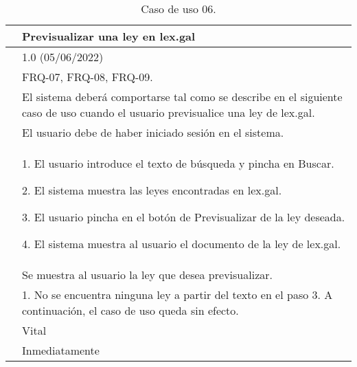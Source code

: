 \begin{table}[H]
\begin{center}
\begin{tabular}{|p{3cm}|p{10cm}|} \hline
\centering {\bf UC-06} & Previsualizar una ley en lex.gal  \\ \hline\hline
\centering {\bf Versión} & 1.0 (05/06/2022) \\ \hline
\centering {\bf Dependencias} & FRQ-07, FRQ-08, FRQ-09. \\ \hline
\centering {\bf Descripción} &  El sistema deberá comportarse tal como se describe en el siguiente caso de uso cuando el usuario previsualice una ley de lex.gal. \\ \hline
\centering {\bf Precondición} &  El usuario debe de haber iniciado sesión en el sistema. \\ \hline
\centering {\bf Secuencia normal} &  
1. El usuario introduce el texto de búsqueda y pincha en Buscar.

2. El sistema muestra las leyes encontradas en lex.gal.

3. El usuario pincha en el botón de Previsualizar de la ley deseada.

4. El sistema muestra al usuario el documento de la ley de lex.gal.
\\ \hline
\centering {\bf Postcondición} &  Se muestra al usuario la ley que desea previsualizar. \\ \hline
\centering {\bf Excepciones} & 
1. No se encuentra ninguna ley a partir del texto en el paso 3. A continuación, el caso de uso queda sin efecto.
\\ \hline
\centering {\bf Importancia} & Vital \\ \hline
\centering {\bf Urgencia} & Inmediatamente \\ \hline
\end{tabular}
\caption{Caso de uso 06.}
\label{enlaceUC6}
\end{center}
\end{table}

